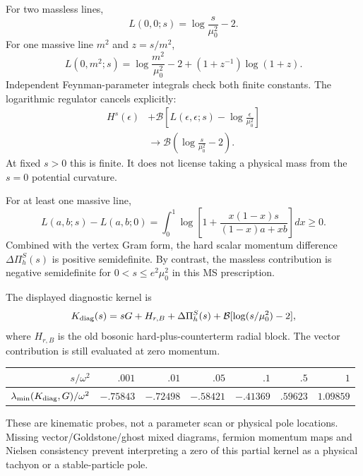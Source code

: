\documentclass[11pt]{article}
\begin{document}
For two massless lines,
\begin{equation}
 L(0,0;s)=\log\frac{s}{\mu_0^2}-2.
 \label{eq:masslessbubble}
\end{equation}
For one massive line $m^2$ and $z=s/m^2$,
\begin{equation}
 L(0,m^2;s)=\log\frac{m^2}{\mu_0^2}-2
                +(1+z^{-1})\log(1+z).
\end{equation}
Independent Feynman-parameter integrals check both finite constants.
The logarithmic regulator cancels explicitly:
\begin{align}
 H^s(\epsilon)&+\mathcal B
 \left[L(\epsilon,\epsilon;s)-\log\frac{\epsilon}{\mu_0^2}\right]
 \nonumber\\
 &\longrightarrow\mathcal B\left(\log\frac{s}{\mu_0^2}-2\right).
 \label{eq:cancel}
\end{align}
At fixed $s>0$ this is finite. It does not license taking a physical
mass from the $s=0$ potential curvature.

For at least one massive line,
\begin{equation}
 L(a,b;s)-L(a,b;0)
 =\int_0^1\log\left[1+\frac{x(1-x)s}{(1-x)a+xb}\right]dx\geq0.
\end{equation}
Combined with the vertex Gram form, the hard scalar momentum
difference $\Delta\Pi^S_h(s)$ is positive semidefinite. By contrast,
the massless contribution is negative semidefinite for
$0<s\leq e^2\mu_0^2$ in this MS prescription.

The displayed diagnostic kernel is
\begin{equation}
 K_{\rm diag}(s)=sG+H_{r,B}
 +\Delta\Pi^S_h(s)+\mathcal B[\log(s/\mu_0^2)-2],
 \label{eq:diag}
\end{equation}
where $H_{r,B}$ is the old bosonic hard-plus-counterterm radial block.
The vector contribution is still evaluated at zero momentum.
\begin{center}
\begin{tabular}{rrrrrrr}
\toprule
$s/\omega^2$ & $.001$ & $.01$ & $.05$ & $.1$ & $.5$ & $1$\\
\midrule
$\lambda_{\min}(K_{\rm diag},G)/\omega^2$
& $-.75843$ & $-.72498$ & $-.58421$ & $-.41369$ & $.59623$ & $1.09859$\\
\bottomrule
\end{tabular}
\end{center}
These are kinematic probes, not a parameter scan or physical pole
locations. Missing vector/Goldstone/ghost mixed diagrams, fermion
momentum maps and Nielsen consistency prevent interpreting a zero of
this partial kernel as a physical tachyon or a stable-particle pole.
\end{document}
